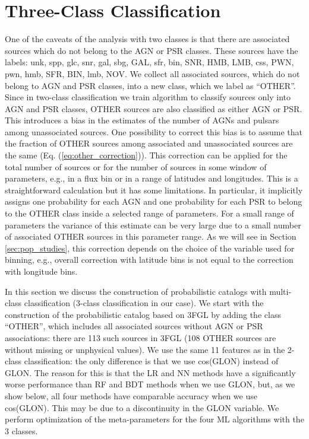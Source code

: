 \section{Three-Class Classification}

One of the caveats of the analysis with two classes is that there are associated sources which do not belong to the AGN or PSR classes. 
These sources have the labels: unk, spp, glc, snr, gal, sbg, GAL, sfr, bin, SNR, HMB, LMB, css, PWN, pwn, hmb, SFR, BIN, lmb, NOV.
We collect all associated sources, which do not belong to AGN and PSR classes, into a new class, which we label as ``OTHER''.
Since in two-class classification we train algorithm to classify sources only into AGN and PSR classes, OTHER sources are also classified as either AGN or PSR.
This introduces a bias in the estimates of the number of AGNs and pulsars among unassociated sources.
One possibility to correct this bias is to assume that the fraction of OTHER sources among associated and unassociated sources are the same (Eq. (\ref{eq:other_correction})).
This correction can be applied for the total number of sources or for the number of sources in some window of parameters,
e.g., in a flux bin or in a range of latitudes and longitudes.
This is a straightforward calculation but it has some limitations. 
In particular, it implicitly assigns one probability for each AGN and one probability for each PSR to belong to the OTHER class inside a selected range of parameters.
For a small range of parameters the variance of this estimate can be very large due to a small number of associated OTHER sources in this parameter range.
As we will see in Section \ref{sec:pop_studies}, this correction depends on the choice of the variable used for binning, e.g.,
overall correction with latitude bins is not equal to the correction with longitude bins.

In this section we discuss the construction of probabilistic catalogs with multi-class classification (3-class classification in our case).
We start with the construction of the probabilistic catalog based on 3FGL by adding the class ``OTHER'', which includes all associated sources without AGN or PSR associations: there are 113 such sources in 3FGL (108 OTHER sources are without missing or unphysical values).
We use the same 11 features as in the 2-class classification: the only difference is that we use cos(GLON) instead of GLON.
The reason for this is that the LR and NN methods have a significantly worse performance than RF and BDT methods when we use GLON,
but, as we show below, all four methods have comparable accuracy when we use cos(GLON).
This may be due to a discontinuity in the GLON variable. 
We perform optimization of the meta-parameters for the four ML algorithms with the 3 classes.


